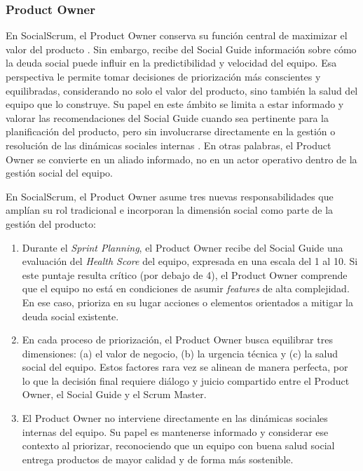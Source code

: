 \subsubsection{Product Owner}

En SocialScrum, el Product Owner conserva su función central de maximizar el valor del producto \cite{schwaber2020scrum}. Sin embargo, recibe del Social Guide información sobre cómo la deuda social puede influir en la predictibilidad y velocidad del equipo. Esa perspectiva le permite tomar decisiones de priorización más conscientes y equilibradas, considerando no solo el valor del producto, sino también la salud del equipo que lo construye.
Su papel en este ámbito se limita a estar informado y valorar las recomendaciones del Social Guide cuando sea pertinente para la planificación del producto, pero sin involucrarse directamente en la gestión o resolución de las dinámicas sociales internas \cite{saeeda2024nontechnicaldebt}.
En otras palabras, el Product Owner se convierte en un aliado informado, no en un actor operativo dentro de la gestión social del equipo.

En SocialScrum, el Product Owner asume tres nuevas responsabilidades que amplían su rol tradicional e incorporan la dimensión social como parte de la gestión del producto:

\begin{enumerate}
    \item Durante el \textit{Sprint Planning}, el Product Owner recibe del Social Guide una evaluación del \textit{Health Score} del equipo, expresada en una escala del 1 al 10. Si este puntaje resulta crítico (por debajo de 4), el Product Owner comprende que el equipo no está en condiciones de asumir \textit{features} de alta complejidad. En ese caso, prioriza en su lugar acciones o elementos orientados a mitigar la deuda social existente.
    \item En cada proceso de priorización, el Product Owner busca equilibrar tres dimensiones: (a) el valor de negocio, (b) la urgencia técnica y (c) la salud social del equipo. Estos factores rara vez se alinean de manera perfecta, por lo que la decisión final requiere diálogo y juicio compartido entre el Product Owner, el Social Guide y el Scrum Master.
    \item El Product Owner no interviene directamente en las dinámicas sociales internas del equipo. Su papel es mantenerse informado y considerar ese contexto al priorizar, reconociendo que un equipo con buena salud social entrega productos de mayor calidad y de forma más sostenible.
\end{enumerate}

